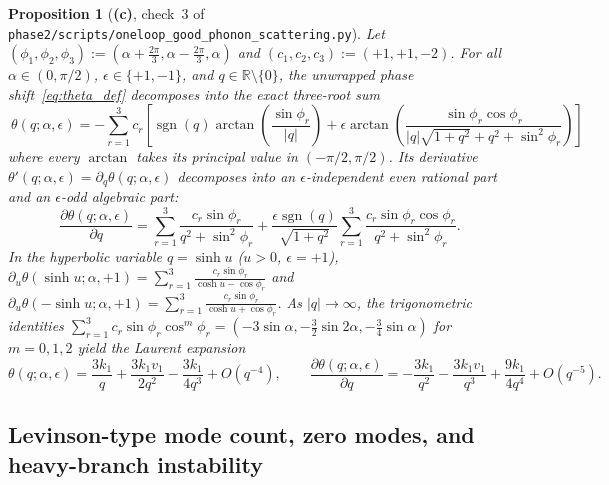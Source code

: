 \documentclass[11pt,a4paper]{article}
\newcommand{\Lc}{\textsf{\textbf{(c)}}}
\newcommand{\script}[1]{\texttt{phase2/\allowbreak scripts/\allowbreak #1}}
\newtheorem{proposition}{Proposition}[section]
\theoremstyle{remark}
\begin{document}
\begin{proposition}[\Lc, check~3 of \script{oneloop\_good\_phonon\_scattering.py}]\label{prop:theta_3root}
Let $(\phi_1,\phi_2,\phi_3):=(\alpha+\frac{2\pi}{3},\alpha-\frac{2\pi}{3},\alpha)$ and $(c_1,c_2,c_3):=(+1,+1,-2)$. For all $\alpha\in(0,\pi/2)$, $\epsilon\in\{+1,-1\}$, and $q\in\mathbb{R}\setminus\{0\}$, the unwrapped phase shift~\eqref{eq:theta_def} decomposes into the exact three-root sum
\begin{equation}\label{eq:theta_3root_formula}
\boxed{\ \theta(q;\alpha,\epsilon)=-\sum_{r=1}^3 c_r\left[\operatorname{sgn}(q)\arctan\!\left(\frac{\sin\phi_r}{|q|}\right)
+\epsilon\arctan\!\left(\frac{\sin\phi_r\cos\phi_r}{|q|\sqrt{1+q^2}+q^2+\sin^2\phi_r}\right)\right]\ }
\end{equation}
where every $\arctan$ takes its principal value in $(-\pi/2,\pi/2)$. Its derivative $\theta'(q;\alpha,\epsilon)=\partial_q\theta(q;\alpha,\epsilon)$ decomposes into an $\epsilon$-independent even rational part and an $\epsilon$-odd algebraic part:
\begin{equation}\label{eq:dtheta_formula}
\boxed{\ \frac{\partial\theta(q;\alpha,\epsilon)}{\partial q}
=\sum_{r=1}^3\frac{c_r\sin\phi_r}{q^2+\sin^2\phi_r}
+\frac{\epsilon\operatorname{sgn}(q)}{\sqrt{1+q^2}}\sum_{r=1}^3\frac{c_r\sin\phi_r\cos\phi_r}{q^2+\sin^2\phi_r}.\ }
\end{equation}
In the hyperbolic variable $q=\sinh u$ ($u>0$, $\epsilon=+1$), $\partial_u\theta(\sinh u;\alpha,+1)=\sum_{r=1}^3\frac{c_r\sin\phi_r}{\cosh u-\cos\phi_r}$ and $\partial_u\theta(-\sinh u;\alpha,+1)=\sum_{r=1}^3\frac{c_r\sin\phi_r}{\cosh u+\cos\phi_r}$. As $|q|\to\infty$, the trigonometric identities $\sum_{r=1}^3 c_r\sin\phi_r\cos^m\phi_r=(-3\sin\alpha,-\tfrac32\sin 2\alpha,-\tfrac34\sin\alpha)$ for $m=0,1,2$ yield the Laurent expansion
\begin{equation}\label{eq:theta_asymptotic}
\theta(q;\alpha,\epsilon)=\frac{3k_1}{q}+\frac{3k_1 v_1}{2q^2}-\frac{3k_1}{4q^3}+O(q^{-4}),\qquad
\frac{\partial\theta(q;\alpha,\epsilon)}{\partial q}=-\frac{3k_1}{q^2}-\frac{3k_1 v_1}{q^3}+\frac{9k_1}{4q^4}+O(q^{-5}).
\end{equation}
\end{proposition}

\subsection{Levinson-type mode count, zero modes, and heavy-branch instability}\label{sec:levinson}
\end{document}
